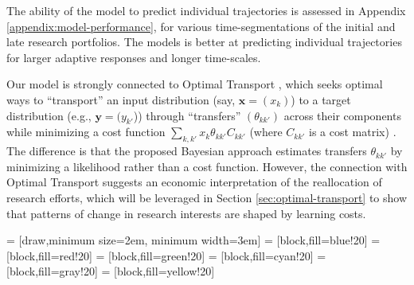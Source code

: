 \documentclass{article}
\begin{document}
The ability of the model to predict individual trajectories is assessed in Appendix \ref{appendix:model-performance}, for various time-segmentations of the initial and late research portfolios. The models is better at predicting individual trajectories for larger adaptive responses and longer time-scales.  %

Our model is strongly connected to Optimal Transport \citep{muzellec2017tsallis,li2019learning}, which seeks optimal ways to  ``transport'' an input distribution (say, $\bm{x}=(x_k)$) to a target distribution (e.g., $\bm{y}=(y_{k'}$)) through ``transfers'' $(\theta_{kk'})$ across their components while minimizing a cost function $\sum_{k,k'} x_{k} \theta_{kk'}C_{kk'}$ (where $C_{kk'}$ is a cost matrix) \citep{Peyr2019}. The difference is that the proposed Bayesian approach estimates transfers $\theta_{kk'}$ by minimizing a likelihood rather than a cost function. However, the connection with Optimal Transport suggests an economic interpretation of the reallocation of research efforts, which will be leveraged in Section \ref{sec:optimal-transport} to show that patterns of change in research interests are shaped by learning costs. %


     = [draw,minimum size=2em, minimum width=3em]
     = [block,fill=blue!20]
     = [block,fill=red!20]
     = [block,fill=green!20]
     = [block,fill=cyan!20]
     = [block,fill=gray!20]
     = [block,fill=yellow!20]
    
\end{document}
